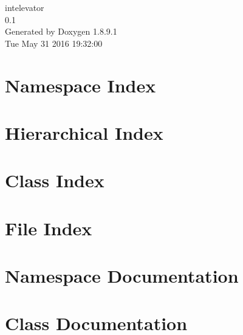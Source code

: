 \documentclass[twoside]{book}
\newcommand{\+}{\discretionary{\mbox{\scriptsize$\hookleftarrow$}}{}{}}
\newcommand{\clearemptydoublepage}{%
  \newpage{\pagestyle{empty}\cleardoublepage}%
}
\begin{document}
\begin{titlepage}
\vspace*{7cm}
\begin{center}%
{\Large intelevator \\[1ex]\large 0.\+1 }\\
\vspace*{1cm}
{\large Generated by Doxygen 1.8.9.1}\\
\vspace*{0.5cm}
{\small Tue May 31 2016 19:32:00}\\
\end{center}
\end{titlepage}
\clearemptydoublepage
\tableofcontents
\clearemptydoublepage
{}

\chapter{Namespace Index}

\chapter{Hierarchical Index}

\chapter{Class Index}

\chapter{File Index}

\chapter{Namespace Documentation}


\chapter{Class Documentation}


































\end{document}
